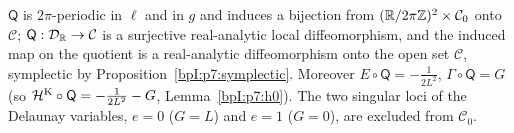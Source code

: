\begin{theorem}\label{bpI:p7:chart}
$\mathsf Q$ is $2\pi$-periodic in $\ell$ and in $g$ and induces a bijection from $(\mathbb{R}/2\pi\mathbb{Z})^2\times\mathcal C_0$ onto $\mathcal C$; $\mathsf Q:\mathcal D_{\mathbb{R}}\to\mathcal C$ is a surjective real-analytic local diffeomorphism, and the induced map on the quotient is a real-analytic diffeomorphism onto the open set $\mathcal C$, symplectic by Proposition~\ref{bpI:p7:symplectic}. Moreover
$E\circ\mathsf Q=-\tfrac1{2L^2}$, $\Gamma\circ\mathsf Q=G$ (so $\mathcal H^{\rm K}\circ\mathsf Q=-\tfrac1{2L^2}-G$, Lemma~\ref{bpI:p7:h0}). The two singular loci of the Delaunay variables, $e=0$ ($G=L$) and $e=1$ ($G=0$), are excluded from $\mathcal C_0$.
\end{theorem}
